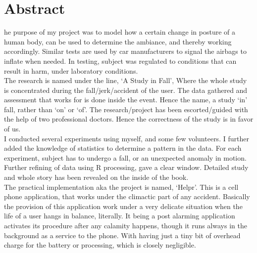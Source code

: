 %
%
%

\chapter*{Abstract}
\begin{SingleSpace}
he purpose of my project was to model how a certain change in posture of a human body, can be used to determine the ambiance, and thereby working accordingly. Similar tests are used by car manufacturers to signal the airbags to inflate when needed. In testing, subject was regulated to conditions that can result in harm, under laboratory conditions. \\

The research is named under the line, `A Study in Fall', Where the whole study is concentrated during the fall/jerk/accident of the user. The data gathered and assessment that works for is done inside the event. Hence the name, a study `in' fall, rather than `on' or `of'. The research/project has been escorted/guided with the help of two professional doctors. Hence the correctness of the study is in favor of us.\\

I conducted several experiments using myself, and some few volunteers. I further added the knowledge of statistics to determine a pattern in the data. For each experiment, subject has to undergo a fall, or an unexpected anomaly in motion. Further refining of data using R processing, gave a clear window. Detailed study and whole story has been revealed on the inside of the book.\\

The practical implementation aka the project is named, `Helpr'. This is a cell phone application, that works under the climactic part of any accident. Basically the provision of this application work under a very delicate situation when the life of a user hangs in balance, literally. It being a post alarming application activates its procedure after any calamity happens, though it runs always in the background as a service to the phone. With having just a tiny bit of overhead charge for the battery or processing, which is closely negligible.\\


\end{SingleSpace}

